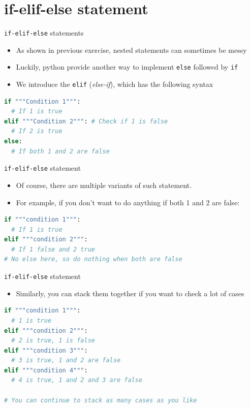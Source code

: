\documentclass[10pt,xcolor={table,dvipsnames},t]{beamer}
\begin{document}
\section{if-elif-else statement}
\begin{frame}[fragile]{\texttt{if-elif-else} statements}
  \begin{itemize}
    \item As shown in previous exercise, nested statements can sometimes be messy
    \item Luckily, python provide another way to implement \texttt{else} followed by \texttt{if}
    \item We introduce the \texttt{elif} (\textit{else-if}), which has the following syntax
  \end{itemize}
\begin{lstlisting}[language=python]
if """Condition 1""":
  # If 1 is true
elif """Condition 2""": # Check if 1 is false 
  # If 2 is true
else:
  # If both 1 and 2 are false
\end{lstlisting}
\end{frame}

\begin{frame}[fragile]{\texttt{if-elif-else} statement}
  \begin{itemize}
    \item Of course, there are multiple variants of such statement. 
    \item For example, if you don't want to do anything if both 1 and 2 are false:
  \end{itemize}
\begin{lstlisting}[language=python]
if """condition 1""":
  # If 1 is true 
elif """condition 2""":
  # If 1 false and 2 true
# No else here, so do nothing when both are false
\end{lstlisting}
\end{frame}

\begin{frame}[fragile]{\texttt{if-elif-else} statement}
  \begin{itemize}
    \item Similarly, you can stack them together if you want to check a lot of cases
  \end{itemize}
\begin{lstlisting}[language=python]
if """condition 1""":
  # 1 is true
elif """condition 2""":
  # 2 is true, 1 is false
elif """condition 3""":
  # 3 is true, 1 and 2 are false
elif """condition 4""":
  # 4 is true, 1 and 2 and 3 are false 

# You can continue to stack as many cases as you like
\end{lstlisting}
\end{frame}
\end{document}
